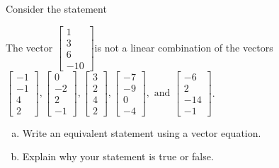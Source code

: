 
\begin{exerciseStatement}


Consider the statement 
\begin{center}\begin{minipage}{0.8\textwidth}
 The vector \( \left[\begin{array}{c}
1 \\
3 \\
6 \\
-10
\end{array}\right] \)is not a linear combination of the vectors \( \left[\begin{array}{c}
-1 \\
-1 \\
4 \\
2
\end{array}\right] , \left[\begin{array}{c}
0 \\
-2 \\
2 \\
-1
\end{array}\right] , \left[\begin{array}{c}
3 \\
2 \\
4 \\
2
\end{array}\right] , \left[\begin{array}{c}
-7 \\
-9 \\
0 \\
-4
\end{array}\right] , \text{ and } \left[\begin{array}{c}
-6 \\
2 \\
-14 \\
-1
\end{array}\right] \). 
\end{minipage}\end{center}
    


\begin{enumerate}[(a)]
\item  Write an equivalent statement using a vector equation.
\item  Explain why your statement is true or false.
\end{enumerate}
    
\end{exerciseStatement}
    
